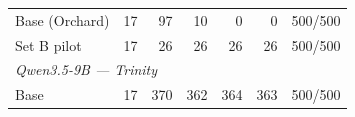 \begin{table}[t]
{\begin{tabular}{lrrrrrr}
Base (Orchard) & 17 & 97 & 10 & 0 & 0 & 500/500 \\
Set B pilot & 17 & 26 & 26 & 26 & 26 & 500/500 \\
\midrule
\multicolumn{7}{l}{\textit{Qwen3.5-9B --- Trinity}} \\
Base & 17 & 370 & 362 & 364 & 363 & 500/500 \\

\end{tabular}}
\end{table}
